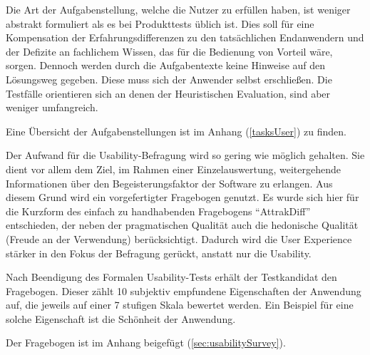 Die Art der Aufgabenstellung, welche die Nutzer zu erfüllen haben, ist weniger abstrakt formuliert als es bei Produkttests üblich ist. Dies soll für eine Kompensation der Erfahrungsdifferenzen zu den tatsächlichen Endanwendern und der Defizite an fachlichem Wissen, das für die Bedienung von Vorteil wäre, sorgen. Dennoch werden durch die Aufgabentexte keine Hinweise auf den Lösungsweg gegeben. Diese muss sich der Anwender selbst erschließen. Die Testfälle orientieren sich an denen der Heuristischen Evaluation, sind aber weniger umfangreich.\par
Eine Übersicht der Aufgabenstellungen ist im Anhang (\ref{tasksUser}) zu finden.\par
{}
Der Aufwand für die Usability-Befragung wird so gering wie möglich gehalten. Sie dient vor allem dem Ziel, im Rahmen einer Einzelauswertung, weitergehende Informationen über den Begeisterungsfaktor der Software zu erlangen. Aus diesem Grund wird ein vorgefertigter Fragebogen genutzt. Es wurde sich hier für die Kurzform des einfach zu handhabenden Fragebogens \enquote{AttrakDiff} entschieden, der neben der pragmatischen Qualität auch die hedonische Qualität (Freude an der Verwendung) berücksichtigt. Dadurch wird die User Experience stärker in den Fokus der Befragung gerückt, anstatt nur die Usability.\cite[S. 237]{Moser2012}\par
Nach Beendigung des Formalen Usability-Tests erhält der Testkandidat den Fragebogen. Dieser zählt 10 subjektiv empfundene Eigenschaften der Anwendung auf, die jeweils auf einer 7 stufigen Skala bewertet werden. Ein Beispiel für eine solche Eigenschaft ist die Schönheit der Anwendung.\par
Der Fragebogen ist im Anhang beigefügt (\ref{sec:usabilitySurvey}).\par
